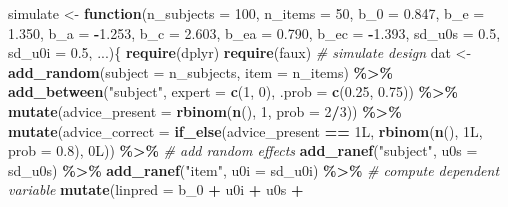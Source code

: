 \documentclass[
  man,floatsintext]{apa6}
\newenvironment{Shaded}{\begin{snugshade}}{\end{snugshade}}
\newcommand{\AttributeTok}[1]{\textcolor[rgb]{0.13,0.29,0.53}{#1}}
\newcommand{\CommentTok}[1]{\textcolor[rgb]{0.56,0.35,0.01}{\textit{#1}}}
\newcommand{\ControlFlowTok}[1]{\textcolor[rgb]{0.13,0.29,0.53}{\textbf{#1}}}
\newcommand{\DecValTok}[1]{\textcolor[rgb]{0.00,0.00,0.81}{#1}}
\newcommand{\FloatTok}[1]{\textcolor[rgb]{0.00,0.00,0.81}{#1}}
\newcommand{\FunctionTok}[1]{\textcolor[rgb]{0.13,0.29,0.53}{\textbf{#1}}}
\newcommand{\NormalTok}[1]{#1}
\newcommand{\OtherTok}[1]{\textcolor[rgb]{0.56,0.35,0.01}{#1}}
\newcommand{\SpecialCharTok}[1]{\textcolor[rgb]{0.81,0.36,0.00}{\textbf{#1}}}
\newcommand{\StringTok}[1]{\textcolor[rgb]{0.31,0.60,0.02}{#1}}
\begin{document}
\begin{Shaded}
\begin{Highlighting}[]
\NormalTok{simulate }\OtherTok{\textless{}{-}} \ControlFlowTok{function}\NormalTok{(}\AttributeTok{n\_subjects =} \DecValTok{100}\NormalTok{, }\AttributeTok{n\_items =} \DecValTok{50}\NormalTok{,}
  \AttributeTok{b\_0 =} \FloatTok{0.847}\NormalTok{, }\AttributeTok{b\_e =} \FloatTok{1.350}\NormalTok{, }\AttributeTok{b\_a =} \SpecialCharTok{{-}}\FloatTok{1.253}\NormalTok{, }\AttributeTok{b\_c =} \FloatTok{2.603}\NormalTok{,}
  \AttributeTok{b\_ea =} \FloatTok{0.790}\NormalTok{, }\AttributeTok{b\_ec =} \SpecialCharTok{{-}}\FloatTok{1.393}\NormalTok{,}
  \AttributeTok{sd\_u0s =} \FloatTok{0.5}\NormalTok{, }\AttributeTok{sd\_u0i =} \FloatTok{0.5}\NormalTok{, ...)\{}
  \FunctionTok{require}\NormalTok{(dplyr)}
  \FunctionTok{require}\NormalTok{(faux)}
  \CommentTok{\# simulate design}
\NormalTok{  dat }\OtherTok{\textless{}{-}} \FunctionTok{add\_random}\NormalTok{(}\AttributeTok{subject =}\NormalTok{ n\_subjects, }\AttributeTok{item =}\NormalTok{ n\_items) }\SpecialCharTok{\%\textgreater{}\%}
    \FunctionTok{add\_between}\NormalTok{(}\StringTok{"subject"}\NormalTok{, }\AttributeTok{expert =} \FunctionTok{c}\NormalTok{(}\DecValTok{1}\NormalTok{, }\DecValTok{0}\NormalTok{), }\AttributeTok{.prob =} \FunctionTok{c}\NormalTok{(}\FloatTok{0.25}\NormalTok{, }\FloatTok{0.75}\NormalTok{)) }\SpecialCharTok{\%\textgreater{}\%}
    \FunctionTok{mutate}\NormalTok{(}\AttributeTok{advice\_present =} \FunctionTok{rbinom}\NormalTok{(}\FunctionTok{n}\NormalTok{(), }\DecValTok{1}\NormalTok{, }\AttributeTok{prob =} \DecValTok{2}\SpecialCharTok{/}\DecValTok{3}\NormalTok{)) }\SpecialCharTok{\%\textgreater{}\%}
    \FunctionTok{mutate}\NormalTok{(}\AttributeTok{advice\_correct =} \FunctionTok{if\_else}\NormalTok{(advice\_present }\SpecialCharTok{==}\NormalTok{ 1L, }
                                    \FunctionTok{rbinom}\NormalTok{(}\FunctionTok{n}\NormalTok{(), 1L, }\AttributeTok{prob =} \FloatTok{0.8}\NormalTok{), 0L)) }\SpecialCharTok{\%\textgreater{}\%}
    \CommentTok{\# add random effects}
    \FunctionTok{add\_ranef}\NormalTok{(}\StringTok{"subject"}\NormalTok{, }\AttributeTok{u0s =}\NormalTok{ sd\_u0s) }\SpecialCharTok{\%\textgreater{}\%}
    \FunctionTok{add\_ranef}\NormalTok{(}\StringTok{"item"}\NormalTok{, }\AttributeTok{u0i =}\NormalTok{ sd\_u0i) }\SpecialCharTok{\%\textgreater{}\%}
    \CommentTok{\# compute dependent variable}
    \FunctionTok{mutate}\NormalTok{(}\AttributeTok{linpred =}\NormalTok{ b\_0 }\SpecialCharTok{+}\NormalTok{ u0i }\SpecialCharTok{+}\NormalTok{ u0s }\SpecialCharTok{+}

\end{Highlighting}
\end{Shaded}
\end{document}
